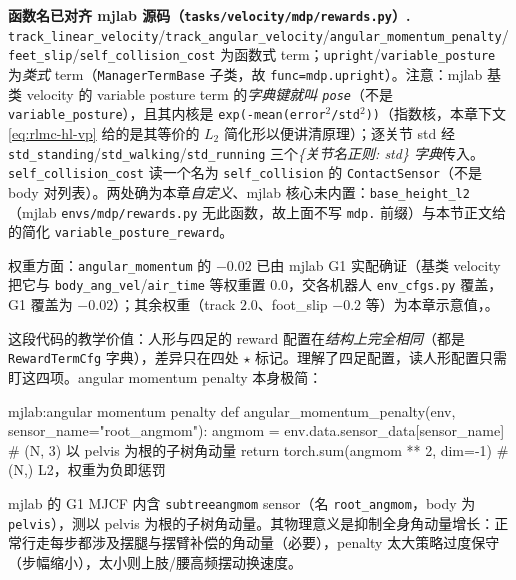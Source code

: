 \begin{note}
\textbf{函数名已对齐 mjlab 源码（\texttt{tasks/\allowbreak velocity/\allowbreak mdp/\allowbreak rewards.\allowbreak py}）.}\;
\texttt{track\_linear\_velocity}/\allowbreak\texttt{track\_angular\_velocity}/\allowbreak\texttt{angular\_momentum\_penalty}/\allowbreak\texttt{feet\_slip}/\allowbreak\texttt{self\_collision\_cost} 为函数式 term；\texttt{upright}/\allowbreak\texttt{variable\_posture} 为\emph{类式} term（\texttt{ManagerTermBase} 子类，故 \texttt{func=mdp.\allowbreak upright}）。注意：mjlab 基类 velocity 的 variable posture term 的\emph{字典键就叫 \texttt{pose}}（不是 \texttt{variable\_posture}），且其内核是 \texttt{exp(-mean(error$^2$/\allowbreak std$^2$))}（指数核，本章下文 \eqref{eq:rlmc-hl-vp} 给的是其等价的 $L_2$ 简化形以便讲清原理）；逐关节 std 经 \texttt{std\_standing}/\allowbreak\texttt{std\_walking}/\allowbreak\texttt{std\_running} 三个\emph{\{关节名正则: std\} 字典}传入。\texttt{self\_collision\_cost} 读一个名为 \texttt{self\_collision} 的 \texttt{ContactSensor}（不是 body 对列表）。两处确为本章\emph{自定义}、mjlab 核心未内置：\texttt{base\_height\_l2}（mjlab \texttt{envs/\allowbreak mdp/\allowbreak rewards.\allowbreak py} 无此函数，故上面不写 \texttt{mdp.} 前缀）与本节正文给的简化 \texttt{variable\_posture\_reward}。
\end{note}

\noindent{}权重方面：\texttt{angular\_momentum} 的 $-0.02$ 已由 mjlab G1 实配确证（基类 velocity 把它与 \texttt{body\_ang\_vel}/\allowbreak\texttt{air\_time} 等权重置 $0.0$，交各机器人 \texttt{env\_cfgs.\allowbreak py} 覆盖，G1 覆盖为 $-0.02$）；其余权重（track $2.0$、foot\_slip $-0.2$ 等）为本章示意值，。

这段代码的教学价值：人形与四足的 reward 配置在\emph{结构上完全相同}（都是 \texttt{RewardTermCfg} 字典），差异只在四处 $\star$ 标记。理解了四足配置，读人形配置只需盯这四项。angular momentum penalty 本身极简：
\begin{codebox}[Python]{mjlab:angular momentum penalty}
def angular_momentum_penalty(env, sensor_name="root_angmom"):
    angmom = env.data.sensor_data[sensor_name]   # (N, 3) 以 pelvis 为根的子树角动量
    return torch.sum(angmom ** 2, dim=-1)        # (N,) L2，权重为负即惩罚
\end{codebox}

mjlab 的 G1 MJCF 内含 \texttt{subtreeangmom} sensor（名 \texttt{root\_angmom}，body 为 \texttt{pelvis}），测以 pelvis 为根的子树角动量。其物理意义是抑制全身角动量增长：正常行走每步都涉及摆腿与摆臂补偿的角动量（必要），penalty 太大策略过度保守（步幅缩小），太小则上肢/腰高频摆动换速度。

